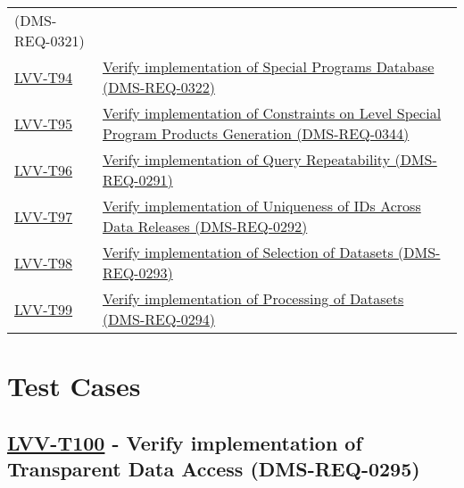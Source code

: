 \begin{longtable}[]{@{}ll@{}}
{(DMS-REQ-0321)}\tabularnewline
\protect\hyperlink{lvv-t94---verify-implementation-of-special-programs-database-dms-req-0322}{LVV-T94}
&
\href{https://jira.lsstcorp.org/secure/Tests.jspa\#/testCase/LVV-T94}{Verify
implementation of Special Programs Database
(DMS-REQ-0322)}\tabularnewline
\protect\hyperlink{lvv-t95---verify-implementation-of-constraints-on-level-special-program-products-generation-dms-req-0344}{LVV-T95}
&
\href{https://jira.lsstcorp.org/secure/Tests.jspa\#/testCase/LVV-T95}{Verify
implementation of Constraints on Level Special Program Products
Generation (DMS-REQ-0344)}\tabularnewline
\protect\hyperlink{lvv-t96---verify-implementation-of-query-repeatability-dms-req-0291}{LVV-T96}
&
\href{https://jira.lsstcorp.org/secure/Tests.jspa\#/testCase/LVV-T96}{Verify
implementation of Query Repeatability (DMS-REQ-0291)}\tabularnewline
\protect\hyperlink{lvv-t97---verify-implementation-of-uniqueness-of-ids-across-data-releases--dms-req-0292}{LVV-T97}
&
\href{https://jira.lsstcorp.org/secure/Tests.jspa\#/testCase/LVV-T97}{Verify
implementation of Uniqueness of IDs Across Data Releases
(DMS-REQ-0292)}\tabularnewline
\protect\hyperlink{lvv-t98---verify-implementation-of-selection-of-datasets-dms-req-0293}{LVV-T98}
&
\href{https://jira.lsstcorp.org/secure/Tests.jspa\#/testCase/LVV-T98}{Verify
implementation of Selection of Datasets (DMS-REQ-0293)}\tabularnewline
\protect\hyperlink{lvv-t99---verify-implementation-of-processing-of-datasets-dms-req-0294}{LVV-T99}
&
\href{https://jira.lsstcorp.org/secure/Tests.jspa\#/testCase/LVV-T99}{Verify
implementation of Processing of Datasets (DMS-REQ-0294)}\tabularnewline
\bottomrule
\end{longtable}

\hypertarget{test-cases}{%
\section{Test Cases}\label{test-cases}}

\hypertarget{lvv-t100---verify-implementation-of-transparent-data-access-dms-req-0295}{%
\subsection{\texorpdfstring{\href{https://jira.lsstcorp.org/secure/Tests.jspa\#/testCase/LVV-T100}{LVV-T100}
- Verify implementation of Transparent Data Access
(DMS-REQ-0295)}{LVV-T100 - Verify implementation of Transparent Data Access (DMS-REQ-0295)}}\label{lvv-t100---verify-implementation-of-transparent-data-access-dms-req-0295}}


